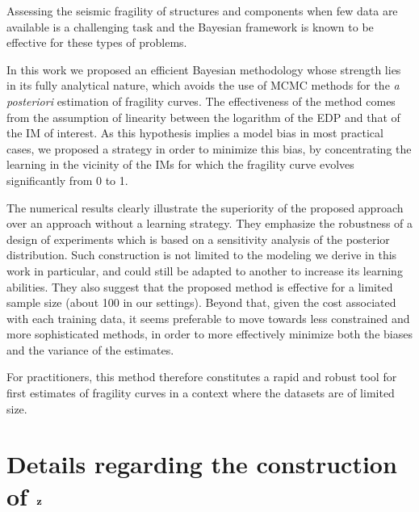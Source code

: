 Assessing the seismic fragility of structures and components when few data are available is a challenging task and the Bayesian framework is known to be effective for these types of problems.

In this work we proposed an efficient Bayesian methodology whose strength lies in its fully analytical nature, which avoids the use of MCMC methods for the \emph{a posteriori} estimation of fragility curves.
The effectiveness of the method comes from the assumption of linearity between the logarithm of the EDP and that of the IM of interest. As this hypothesis implies a model bias in most practical cases, we proposed a strategy in order to minimize this bias, by concentrating the learning in the vicinity of the IMs for which the fragility curve evolves significantly from 0 to 1.

The numerical results clearly illustrate the superiority of the proposed approach over an approach without a learning strategy. 
They emphasize the robustness of a design of experiments which is based on a sensitivity analysis of the posterior distribution.
 Such construction is not limited to the modeling we derive in this work in particular, and could still be adapted to another to increase its learning abilities. 
They also suggest that the proposed method is effective for a limited sample size (about 100 in our settings). Beyond that, given the cost associated with each training data, it seems preferable to move towards less constrained and more sophisticated methods, in order to more effectively minimize both the biases and the variance of the estimates.

For practitioners, this method therefore constitutes a rapid and robust tool for first estimates of fragility curves in a context where the datasets are of limited size.





\section{Details regarding the construction of $\mathbf{z}$}\label{lowdoe:app:sec:DiagUa}


